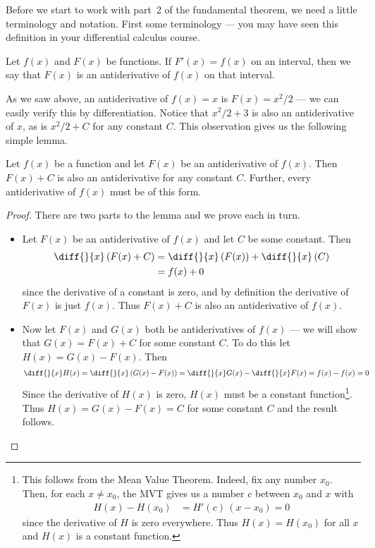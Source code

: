 Before we start to work with part~2 of the fundamental theorem, we need a little
terminology and notation. First some terminology --- you may have seen this
definition in your differential calculus course.
\begin{defn}[Antiderivatives]
 Let $f(x)$ and $F(x)$ be functions. If $F'(x)=f(x)$ on an interval, then we
say that $F(x)$ is an antiderivative of $f(x)$ on that interval.
\end{defn}
As we saw above, an antiderivative of $f(x)=x$ is $F(x) = x^2/2$ --- we can
easily verify this by differentiation. Notice that $x^2/2 + 3$ is also an
antiderivative of $x$, as is $x^2/2 + C$ for any constant $C$. This observation
gives us the following simple lemma.
\begin{lemma}\label{lemma:+C}
 Let $f(x)$ be a function and let $F(x)$ be an antiderivative of $f(x)$. Then
$F(x)+C$ is also an antiderivative for any constant $C$. Further, every antiderivative of
$f(x)$ must be of this form.
\end{lemma}
\begin{proof}
There are two parts to the lemma and we prove each in turn.
\begin{itemize}
 \item Let $F(x)$ be an antiderivative of $f(x)$ and let $C$ be some constant. Then
\begin{align*}
  \diff{}{x}\left( F(x) + C \right)
  &=   \diff{}{x}\left( F(x) \right)  +  \diff{}{x}\left( C \right) \\
  &= f(x) + 0
\end{align*}
since the derivative of a constant is zero, and by definition the derivative of $F(x)$ is
just $f(x)$. Thus $F(x)+C$ is also an antiderivative of $f(x)$.
\item Now let $F(x)$ and $G(x)$ both be antiderivatives of $f(x)$ --- we will show that
$G(x) = F(x)+C$ for some constant $C$. To do this let $H(x) = G(x)-F(x)$. Then
\begin{align*}
\diff{}{x}H(x)
&= \diff{}{x}\left( G(x)-F(x) \right)
= \diff{}{x} G(x) - \diff{}{x}F(x)
= f(x) - f(x) = 0
\end{align*}
Since the derivative of $H(x)$ is zero, $H(x)$ must be a constant
function\footnote{This follows from the Mean Value Theorem.
Indeed, fix any number $x_0$. Then, for each $x\ne x_0$, the MVT gives us a number $c$ between $x_0$ and $x$ with
\begin{align*}
H(x)-H(x_0)&= H'(c)\,(x-x_0) = 0
\end{align*}
since the derivative of $H$ is zero everywhere. Thus $H(x)=H(x_0)$ for all $x$
and $H(x)$ is a constant function.}. Thus $H(x)=G(x)-F(x)=C$ for
some constant $C$ and the result follows.
\end{itemize}


\end{proof}

